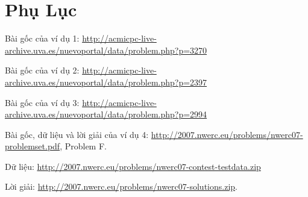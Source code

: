 \documentclass[11pt]{article}
\begin{document}
\section*{Phụ Lục}

\noindent Bài gốc của ví dụ 1:
\url{http://acmicpc-live-archive.uva.es/nuevoportal/data/problem.php?p=3270}

\noindent Bài gốc của ví dụ 2:
\url{http://acmicpc-live-archive.uva.es/nuevoportal/data/problem.php?p=2397}

\noindent Bài gốc của ví dụ 3:
\url{http://acmicpc-live-archive.uva.es/nuevoportal/data/problem.php?p=2994}

\noindent Bài gốc, dữ liệu và lời giải của ví dụ 4:
\url{http://2007.nwerc.eu/problems/nwerc07-problemset.pdf}, Problem F.

\noindent Dữ liệu:
\url{http://2007.nwerc.eu/problems/nwerc07-contest-testdata.zip}

\noindent Lời giải:
\url{http://2007.nwerc.eu/problems/nwerc07-solutions.zip}.
\end{document}
